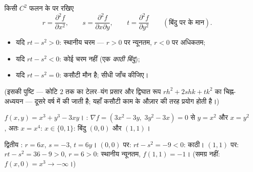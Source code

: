 \begin{method}[द्वितीय-कोटि कसौटी (मोंज संकेतन)]\label{met:b1:multivar:monge}
किसी $C^2$ फलन के  पर रखिए
\[
r = \frac{\partial^2 f}{\partial x^2},
\qquad
s = \frac{\partial^2 f}{\partial x \partial y},
\qquad
t = \frac{\partial^2 f}{\partial y^2}
\qquad (\text{बिंदु पर के मान}).
\]
\begin{itemize}
  \item यदि $rt - s^2 > 0$: स्थानीय चरम --- $r > 0$ पर न्यूनतम, $r < 0$
        पर अधिकतम;
  \item यदि $rt - s^2 < 0$: कोई चरम नहीं (एक \emph{काठी
        बिंदु});
  \item यदि $rt - s^2 = 0$: कसौटी मौन है; सीधी जाँच कीजिए।
\end{itemize}
(इसकी पुष्टि --- कोटि $2$ तक का टेलर--यंग प्रसार और द्विघात रूप $r h^2 +
2shk + tk^2$ का चिह्न-अध्ययन --- दूसरे वर्ष में की जाती है; यहाँ कसौटी
काम के औज़ार की तरह प्रयोग होती है।)
\end{method}

\begin{example}\label{ex:b1:multivar:extrema}
$f(x,y) = x^3 + y^3 - 3xy$। : $\nabla f = (3x^2 - 3y,\; 3y^2
- 3x) = 0$ से $y = x^2$ और $x = y^2$, अतः $x = x^4$: $x \in \{0, 1\}$:
बिंदु $(0,0)$ और $(1,1)$।

द्वितीय : $r = 6x$, $s = -3$, $t = 6y$। $(0,0)$ पर: $rt - s^2 = -9 <
0$: काठी। $(1,1)$ पर: $rt - s^2 = 36 - 9 > 0$, $r = 6 > 0$: स्थानीय
न्यूनतम, $f(1,1) = -1$। (समग्र नहीं: $f(x, 0) = x^3 \to -\infty$।)
\end{example}

